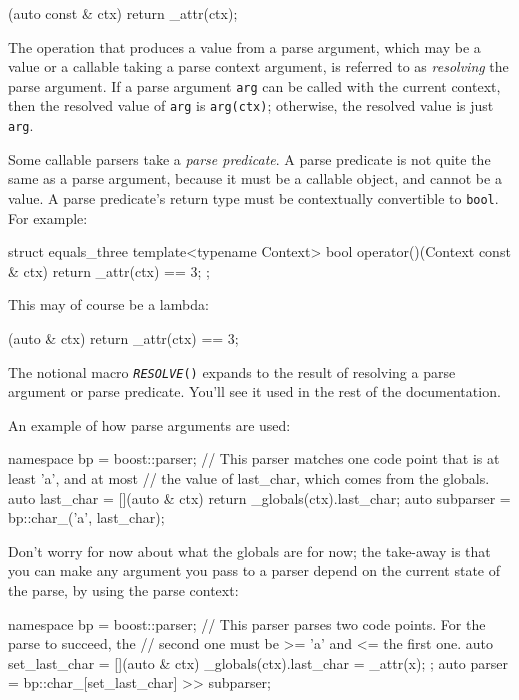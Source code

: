 \begin{code}
[](auto const & ctx) { return _attr(ctx); }
\end{code}

The operation that produces a value from a parse argument, which may be a value or a callable taking a parse context argument, is referred to as \emph{resolving} the parse argument. If a parse argument \texttt{arg} can be called with the current context, then the resolved value of \texttt{arg} is \texttt{arg(ctx)}; otherwise, the resolved value is just \texttt{arg}.

Some callable parsers take a \emph{parse predicate}. A parse predicate is not quite the same as a parse argument, because it must be a callable object, and cannot be a value. A parse predicate's return type must be contextually convertible to \texttt{bool}. For example:

\begin{code}
struct equals_three
{
    template<typename Context>
    bool operator()(Context const & ctx)
    {
        return _attr(ctx) == 3;
    }
};
\end{code}

This may of course be a lambda:

\begin{code}
[](auto & ctx) { return _attr(ctx) == 3; }
\end{code}

The notional macro \emph{\texttt{RESOLVE}}\texttt{()} expands to the result of resolving a parse argument or parse predicate. You'll see it used in the rest of the documentation.

An example of how parse arguments are used:

\begin{code}
namespace bp = boost::parser;
// This parser matches one code point that is at least 'a', and at most
// the value of last_char, which comes from the globals.
auto last_char = [](auto & ctx) { return _globals(ctx).last_char; }
auto subparser = bp::char_('a', last_char);
\end{code}

Don't worry for now about what the globals are for now; the take-away is that you can make any argument you pass to a parser depend on the current state of the parse, by using the parse context:

\begin{code}
namespace bp = boost::parser;
// This parser parses two code points.  For the parse to succeed, the
// second one must be >= 'a' and <= the first one.
auto set_last_char = [](auto & ctx) { _globals(ctx).last_char = _attr(x); };
auto parser = bp::char_[set_last_char] >> subparser;
\end{code}

